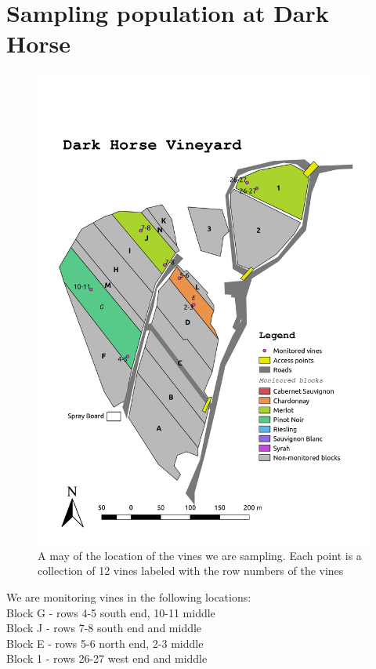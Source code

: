 \documentclass[11pt,letter]{article}
\begin{document}
\section{Sampling population at Dark Horse}
\begin{figure}%
  \includegraphics[width=\linewidth]{DH_map.jpg}
  \caption{A may of the location of the vines we are sampling. Each point is a collection of 12 vines labeled with the row numbers of the vines}
  \label{fig:DH_map}
\end{figure}

We are monitoring vines in the following locations: \\
Block G - rows 4-5 south end, 10-11 middle \\
Block J - rows 7-8 south end and middle \\
Block E - rows 5-6 north end, 2-3 middle \\
Block 1 - rows 26-27 west end and middle \\
\end{document}
